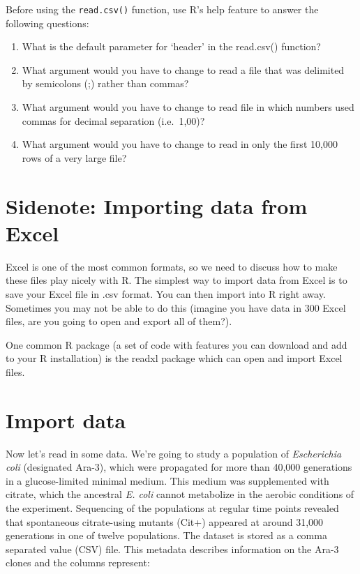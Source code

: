 \documentclass[
]{book}
\providecommand{\tightlist}{%
  \setlength{\itemsep}{0pt}\setlength{\parskip}{0pt}}
\begin{document}
Before using the \texttt{read.csv()} function, use R's help feature to answer the following questions:

\begin{enumerate}
\def\labelenumi{\arabic{enumi}.}
\tightlist
\item
  What is the default parameter for `header' in the read.csv() function?
\item
  What argument would you have to change to read a file that was delimited by semicolons (;) rather than commas?
\item
  What argument would you have to change to read file in which numbers used commas for decimal separation (i.e.~1,00)?
\item
  What argument would you have to change to read in only the first 10,000 rows of a very large file?
\end{enumerate}

\hypertarget{sidenote-importing-data-from-excel}{%
\section{Sidenote: Importing data from Excel}\label{sidenote-importing-data-from-excel}}

Excel is one of the most common formats, so we need to discuss how to make these files play nicely with R. The simplest way to import data from Excel is to save your Excel file in .csv format. You can then import into R right away. Sometimes you may not be able to do this (imagine you have data in 300 Excel files, are you going to open and export all of them?).

One common R package (a set of code with features you can download and add to your R installation) is the readxl package which can open and import Excel files.

\hypertarget{import-data}{%
\section{Import data}\label{import-data}}

Now let's read in some data. We're going to study a population of \emph{Escherichia coli} (designated Ara-3), which were propagated for more than 40,000 generations in a glucose-limited minimal medium. This medium was supplemented with citrate, which the ancestral \emph{E. coli} cannot metabolize in the aerobic conditions of the experiment. Sequencing of the populations at regular time points revealed that spontaneous citrate-using mutants (Cit+) appeared at around 31,000 generations in one of twelve populations. The dataset is stored as a comma separated value (CSV) file. This metadata describes information on the Ara-3 clones and the columns represent:
\end{document}
